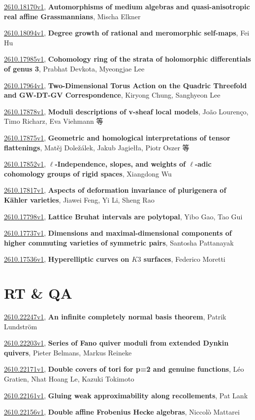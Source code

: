 \documentclass[9pt, a4paper]{article}
\theoremstyle{plain}
\theoremstyle{definition}
\theoremstyle{remark}
\newcommand{\arxiv}[3]{\href{https://arxiv.org/abs/#1}{#1}, \textbf{\textcolor{arxivblue}{#2}}, #3}
\begin{document}
\arxiv{2610.18170v1}{Automorphisms of medium algebras and quasi-anisotropic real affine Grassmannians}{Mischa Elkner}

\arxiv{2610.18094v1}{Degree growth of rational and meromorphic self-maps}{Fei Hu}

\arxiv{2610.17985v1}{Cohomology ring of the strata of holomorphic differentials of genus 3}{Prabhat Devkota, Myeongjae Lee}

\arxiv{2610.17964v1}{Two-Dimensional Torus Action on the Quadric Threefold and GW-DT-GV Correspondence}{Kiryong Chung, Sanghyeon Lee}

\arxiv{2610.17878v1}{Moduli descriptions of v-sheaf local models}{João Lourenço, Timo Richarz, Eva Viehmann 等}

\arxiv{2610.17875v1}{Geometric and homological interpretations of tensor flattenings}{Matěj Doležálek, Jakub Jagiełła, Piotr Oszer 等}

\arxiv{2610.17852v1}{$\ell$-Independence, slopes, and weights of $\ell$-adic cohomology groups of rigid spaces}{Xiangdong Wu}

\arxiv{2610.17817v1}{Aspects of deformation invariance of plurigenera of Kähler varieties}{Jiawei Feng, Yi Li, Sheng Rao}

\arxiv{2610.17798v1}{Lattice Bruhat intervals are polytopal}{Yibo Gao, Tao Gui}

\arxiv{2610.17737v1}{Dimensions and maximal-dimensional components of higher commuting varieties of symmetric pairs}{Santosha Pattanayak}

\arxiv{2610.17536v1}{Hyperelliptic curves on $K3$ surfaces}{Federico Moretti}


\section{RT \& QA}
\arxiv{2610.22247v1}{An infinite completely normal basis theorem}{Patrik Lundström}

\arxiv{2610.22203v1}{Series of Fano quiver moduli from extended Dynkin quivers}{Pieter Belmans, Markus Reineke}

\arxiv{2610.22171v1}{Double covers of tori for p=2 and genuine functions}{Léo Gratien, Nhat Hoang Le, Kazuki Tokimoto}

\arxiv{2610.22161v1}{Gluing weak approximability along recollements}{Pat Lank}

\arxiv{2610.22156v1}{Double affine Frobenius Hecke algebras}{Niccolò Mattarei}
\end{document}
